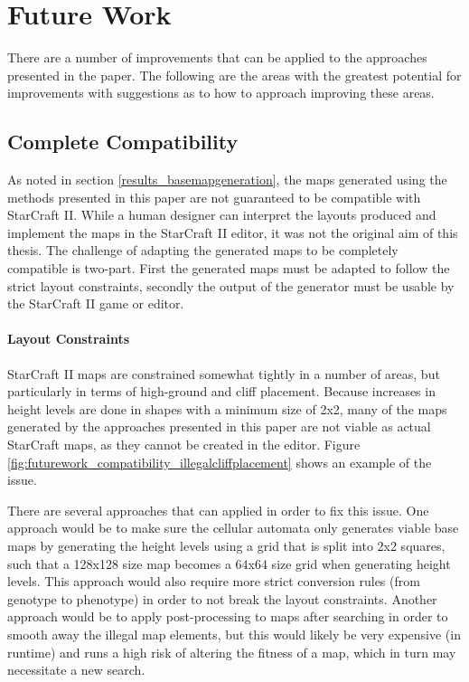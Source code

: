 \chapter{Future Work}
\label{futurework}
There are a number of improvements that can be applied to the approaches presented in the paper. The following are the areas with the greatest potential for improvements with suggestions as to how to approach improving these areas.
\section{Complete Compatibility}
\label{futurework_compatibility}
As noted in section \ref{results_basemapgeneration}, the maps generated using the methods presented in this paper are not guaranteed to be compatible with StarCraft II. While a human designer can interpret the layouts produced and implement the maps in the StarCraft II editor, it was not the original aim of this thesis. The challenge of adapting the generated maps to be completely compatible is two-part. First the generated maps must be adapted to follow the strict layout constraints, secondly the output of the generator must be usable by the StarCraft II game or editor. 

\subsubsection{Layout Constraints}
StarCraft II maps are constrained somewhat tightly in a number of areas, but particularly in terms of high-ground and cliff placement. Because increases in height levels are done in shapes with a minimum size of 2x2, many of the maps generated by the approaches presented in this paper are not viable as actual StarCraft maps, as they cannot be created in the editor. Figure \ref{fig:futurework_compatibility_illegalcliffplacement} shows an example of the issue.


There are several approaches that can applied in order to fix this issue. One approach would be to make sure the cellular automata only generates viable base maps by generating the height levels using a grid that is split into 2x2 squares, such that a 128x128 size map becomes a 64x64 size grid when generating height levels. This approach would also require more strict conversion rules (from genotype to phenotype) in order to not break the layout constraints. Another approach would be to apply post-processing to maps after searching in order to smooth away the illegal map elements, but this would likely be very expensive (in runtime) and runs a high risk of altering the fitness of a map, which in turn may necessitate a new search. 

